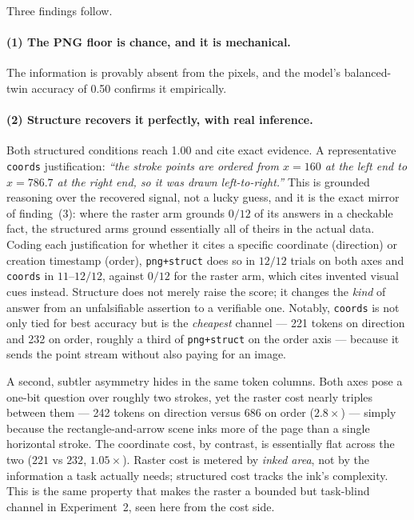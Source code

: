 \documentclass[11pt]{article}
\newcommand{\code}[1]{\texttt{#1}}
\begin{document}
Three findings follow.

\paragraph{(1) The PNG floor is chance, and it is mechanical.} The information is
provably absent from the pixels, and the model's balanced-twin accuracy of 0.50
confirms it empirically.

\paragraph{(2) Structure recovers it perfectly, with real inference.} Both
structured conditions reach 1.00 and cite exact evidence. A representative
\code{coords} justification: \emph{``the stroke points are ordered from $x=160$
at the left end to $x=786.7$ at the right end, so it was drawn left-to-right.''}
This is grounded reasoning over the recovered signal, not a lucky guess, and it is
the exact mirror of finding~(3): where the raster arm grounds $0/12$ of its
answers in a checkable fact, the structured arms ground essentially all of theirs
in the actual data. Coding each justification for whether it cites a specific
coordinate (direction) or creation timestamp (order), \code{png+struct} does so
in $12/12$ trials on both axes and \code{coords} in $11$--$12/12$, against
$0/12$ for the raster arm, which cites invented visual cues instead. Structure
does not merely raise the score; it changes the \emph{kind} of answer from an
unfalsifiable assertion to a verifiable one. Notably, \code{coords} is not only
tied for best accuracy but is the
\emph{cheapest} channel --- 221 tokens on direction and 232 on order, roughly a
third of \code{png+struct} on the order axis --- because it sends the point
stream without also paying for an image.

A second, subtler asymmetry hides in the same token columns. Both axes pose a
one-bit question over roughly two strokes, yet the raster cost nearly triples
between them --- 242 tokens on direction versus 686 on order ($2.8\times$) ---
simply because the rectangle-and-arrow scene inks more of the page than a single
horizontal stroke. The coordinate cost, by contrast, is essentially flat across
the two ($221$ vs $232$, $1.05\times$). Raster cost is metered by \emph{inked
area}, not by the information a task actually needs; structured cost tracks the
ink's complexity. This is the same property that makes the raster a bounded but
task-blind channel in Experiment~2, seen here from the cost side.
\end{document}
